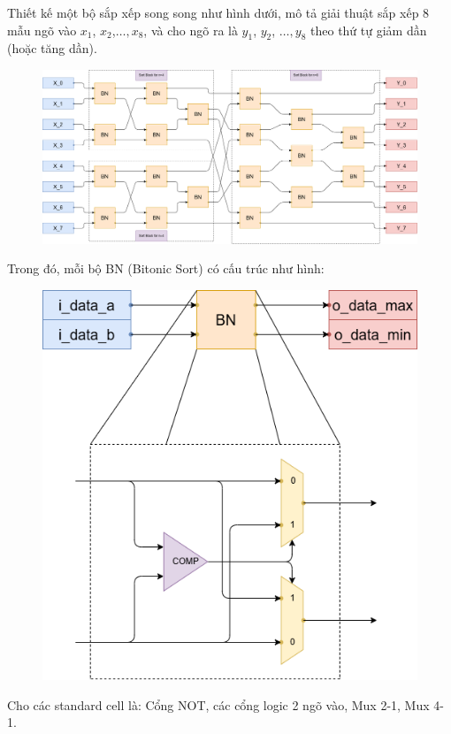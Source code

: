 
Thiết kế một bộ sắp xếp song song như hình dưới, mô tả giải thuật sắp xếp 8 mẫu ngõ vào $x_{1}$, $x_{2}$,$\dots, x_{8}$, và cho ngõ ra là $y_{1}$, $y_{2}$, $\dots, y_{8}$ theo thứ tự giảm dần (hoặc tăng dần).

\begin{figure}[H]
	\centering
	\includegraphics[width=\linewidth]{./my-chapters/my-diagrams/Question6/debai.png}
\end{figure}

Trong đó, mỗi bộ BN (Bitonic Sort) có cấu trúc như hình:

\begin{figure}[H]
	\centering
	\includegraphics[width=.4\linewidth]{./my-chapters/my-diagrams/Question6/Swap_and_compare.png}
\end{figure}

Cho các standard cell là: Cổng NOT, các cổng logic 2 ngõ vào, Mux 2-1, Mux 4-1.


